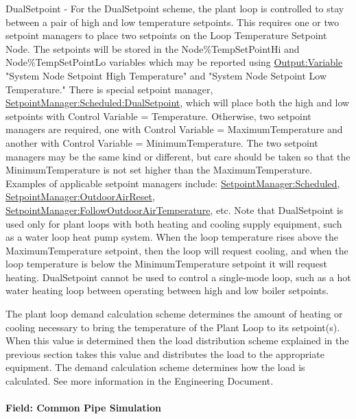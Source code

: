 DualSetpoint - For the DualSetpoint scheme, the plant loop is controlled to stay between a pair of high and low temperature setpoints. This requires one or two setpoint managers to place two setpoints on the Loop Temperature Setpoint Node. The setpoints will be stored in the Node\%TempSetPointHi and Node\%TempSetPointLo variables which may be reported using \hyperref[outputvariable]{Output:Variable} "System Node Setpoint High Temperature" and "System Node Setpoint Low Temperature." There is special setpoint manager, \hyperref[setpointmanagerscheduleddualsetpoint]{SetpointManager:Scheduled:DualSetpoint}, which will place both the high and low setpoints with Control Variable = Temperature. Otherwise, two setpoint managers are required, one with Control Variable = MaximumTemperature and another with Control Variable = MinimumTemperature. The two setpoint managers may be the same kind or different, but care should be taken so that the MinimumTemperature is not set higher than the MaximumTemperature. Examples of applicable setpoint managers include: \hyperref[setpointmanagerscheduled]{SetpointManager:Scheduled}, \hyperref[setpointmanageroutdoorairreset]{SetpointManager:OutdoorAirReset}, \hyperref[setpointmanagerfollowoutdoorairtemperature]{SetpointManager:FollowOutdoorAirTemperature}, etc. Note that DualSetpoint is used only for plant loops with both heating and cooling supply equipment, such as a water loop heat pump system. When the loop temperature rises above the MaximumTemperature setpoint, then the loop will request cooling, and when the loop temperature is below the MinimumTemperature setpoint it will request heating. DualSetpoint cannot be used to control a single-mode loop, such as a hot water heating loop between operating between high and low boiler setpoints.

The plant loop demand calculation scheme determines the amount of heating or cooling necessary to bring the temperature of the Plant Loop to its setpoint(s). When this value is determined then the load distribution scheme explained in the previous section takes this value and distributes the load to the appropriate equipment. The demand calculation scheme determines how the load is calculated. See more information in the Engineering Document.

\paragraph{Field: Common Pipe Simulation}\label{field-common-pipe-simulation}

